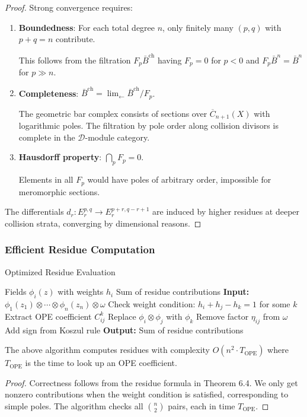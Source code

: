 \begin{proof}
Strong convergence requires:
\begin{enumerate}
\item \textbf{Boundedness}: For each total degree $n$, only finitely many $(p,q)$ with $p+q=n$ contribute.

This follows from the filtration $F_p\bar{B}^{\text{ch}}$ having $F_p = 0$ for $p < 0$ and $F_p\bar{B}^n = \bar{B}^n$ for $p \gg n$.

\item \textbf{Completeness}: $\bar{B}^{\text{ch}} = \lim_{\leftarrow} \bar{B}^{\text{ch}}/F_p$.

The geometric bar complex consists of sections over $\overline{C}_{n+1}(X)$ with logarithmic poles. The filtration by pole order along collision divisors is complete in the $\mathcal{D}$-module category.

\item \textbf{Hausdorff property}: $\bigcap_p F_p = 0$.

Elements in all $F_p$ would have poles of arbitrary order, impossible for meromorphic sections.
\end{enumerate}

The differentials $d_r: E_r^{p,q} \to E_r^{p+r,q-r+1}$ are induced by higher residues at deeper collision strata, converging by dimensional reasons.
\end{proof}

\subsubsection{Efficient Residue Computation}
 
\begin{algorithm}[htbp]
\caption{Optimized Residue Evaluation}
\label{alg:residue-evaluation}
\begin{algorithmic}[1]
\Require Fields $\phi_i(z)$ with weights $h_i$
\Ensure Sum of residue contributions
\State \textbf{Input:} $\phi_1(z_1) \otimes \cdots \otimes \phi_n(z_n) \otimes \omega$
    \State Check weight condition: $h_i + h_j - h_k = 1$ for some $k$
        \State Extract OPE coefficient $C^k_{ij}$
        \State Replace $\phi_i \otimes \phi_j$ with $\phi_k$
        \State Remove factor $\eta_{ij}$ from $\omega$
        \State Add sign from Koszul rule
    \EndIf
\EndFor
\State \textbf{Output:} Sum of residue contributions
\end{algorithmic}
\end{algorithm}

 
\begin{proposition}
The above algorithm computes residues with complexity $O(n^2 \cdot T_{\text{OPE}})$ where $T_{\text{OPE}}$ is the time to look up an OPE coefficient.
\end{proposition}
 
\begin{proof}
Correctness follows from the residue formula in Theorem 6.4. We only get nonzero contributions when the weight condition is satisfied, corresponding to simple poles. The algorithm checks all $\binom{n}{2}$ pairs, each in time $T_{\text{OPE}}$.
\end{proof}